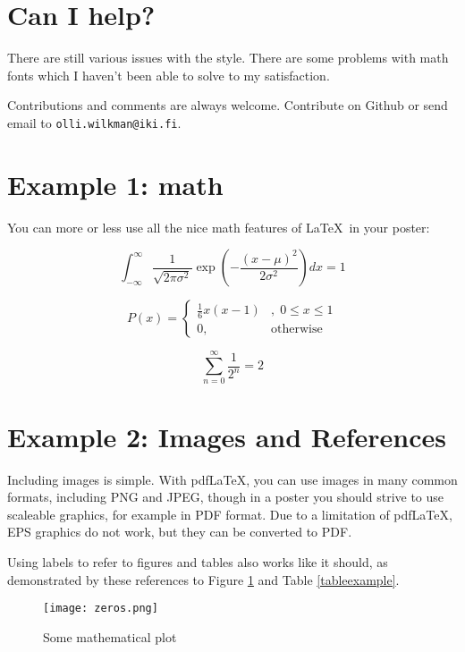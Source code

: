 \documentclass[a0paper,smallertitle]{test1}
\newcommand{\url}[1]{\texttt{#1}}
\begin{document}
\section*{Can I help?}
There are still various issues with the style. There are some problems with math fonts which I haven't been able to solve to my satisfaction.

Contributions and comments are always welcome. Contribute on Github or send email to \url{olli.wilkman@iki.fi}.



\section*{Example 1: math}
You can more or less use all the nice math features of \LaTeX~in your poster:

\begin{equation}
    \int_{-\infty}^{\infty} \frac{1}{\sqrt{2 \pi \sigma^2}} \exp\left(-\frac{(x - \mu)^2}{2 \sigma^2} \right) dx = 1
\end{equation}

\begin{equation}
    P(x) = \left\{ \begin{array}{lr} \frac{1}{6}x(x-1)&,\; 0 \leq x \leq 1 \\ 0, & \text{otherwise}  \end{array} \right.
\end{equation}

\begin{equation}
    \sum_{n=0}^\infty \frac{1}{2^n} = 2
\end{equation}



\section*{Example 2: Images and References}
Including images is simple.  With pdf\LaTeX, you can use images in many common formats, including PNG and JPEG, though in a poster you should strive to use scaleable graphics, for example in PDF format. Due to a limitation of pdf\LaTeX, EPS graphics do not work, but they can be converted to PDF.
    
Using labels to refer to figures and tables also works like it should, as demonstrated by these references to Figure \ref{examplefigure} and Table \ref{tableexample}.

\begin{figure}[H]
\texttt{[image: zeros.png]}
\caption{Some mathematical plot \label{examplefigure}}
\end{figure}
\end{document}
